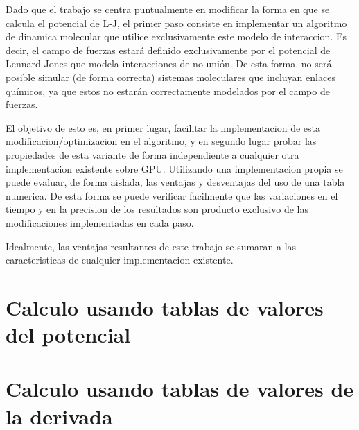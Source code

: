 \documentclass[a4paper,10pt]{report}
\begin{document}
Dado que el trabajo se centra puntualmente en modificar la forma en que se calcula el potencial de L-J, el primer paso consiste en implementar un algoritmo de dinamica molecular que utilice exclusivamente este modelo de interaccion. 
Es decir, el campo de fuerzas estará definido exclusivamente por el potencial de Lennard-Jones que modela interacciones de no-unión. 
De esta forma, no será posible simular (de forma correcta) sistemas moleculares que incluyan enlaces químicos, ya que estos no estarán correctamente modelados por el campo de fuerzas. 

El objetivo de esto es, en primer lugar, facilitar la implementacion de esta modificacion/optimizacion en el algoritmo, y en segundo lugar probar las propiedades de esta variante de forma independiente a cualquier otra implementacion existente sobre GPU. 
Utilizando una implementacion propia se puede evaluar, de forma aislada, las ventajas y desventajas del uso de una tabla numerica. De esta forma se puede verificar facilmente que las variaciones en el tiempo y en la precision de los resultados son producto exclusivo de las modificaciones implementadas en cada paso.

Idealmente, las ventajas resultantes de este trabajo se sumaran a las caracteristicas de cualquier implementacion existente. 









\section{Calculo usando tablas de valores del potencial }





\section{Calculo usando tablas de valores de la derivada  }
\end{document}
